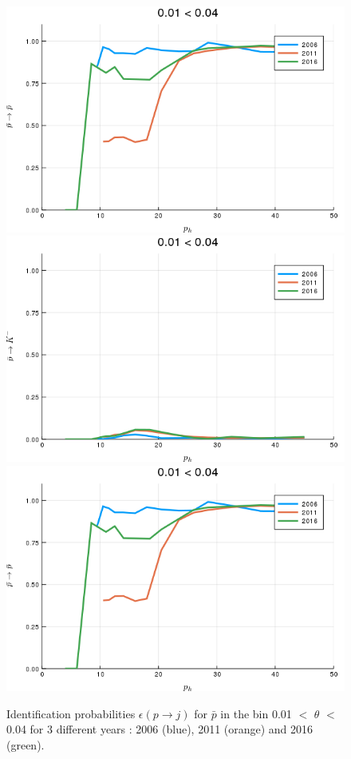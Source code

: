 \begin{figure}[!h]
  \centering
	\includegraphics[scale=0.35]{./gfx/t1/pm2pm.png}
  \includegraphics[scale=0.35]{./gfx/t1/pm2km.png}
  \includegraphics[scale=0.35]{./gfx/t1/pm2pm.png}
	\caption{Identification probabilities $\epsilon(p \rightarrow j)$ for $\bar{p}$ in the bin 0.01 $<$ $\theta$ $<$ 0.04 for 3 different years : 2006 (blue), 2011 (orange) and 2016 (green).}
	\label{pic:comppm}
\end{figure}

